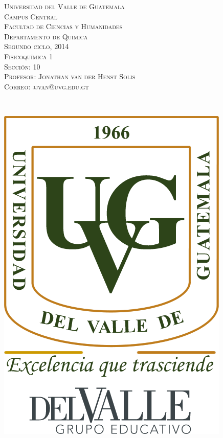 \documentclass[a4paper,12pt]{article}
\begin{document}
\newcommand{\HRule}{\rule{\linewidth}{0.4mm}} %


\begin{minipage}{0.7\textwidth}
\begin{flushleft} 
\textsc{Universidad del Valle de Guatemala \\
Campus Central \\
Facultad de Ciencias y Humanidades \\
Departamento de Qu\'imica \\
Segundo ciclo, 2014 \\
Fisicoqu\'imica 1 \\
Secci\'on: 10 \\
Profesor: Jonathan van der Henst Solis \\
Correo: jjvan@uvg.edu.gt
}
\end{flushleft}
\end{minipage}
~
\begin{minipage}{0.2\textwidth}
\begin{flushright}
\includegraphics[scale=0.4]{Logo_UVG} %
\end{flushright}
\end{minipage}\\
\end{document}
